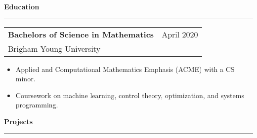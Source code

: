 \documentclass[12pt]{article}
\newenvironment{compactItemize}{
  \begin{itemize}[itemsep=0ex, parsep=0ex, partopsep=0ex, topsep= -7pt]
}{
  \end{itemize}
}
\newcommand{\jobInfo}[4]{
  \begingroup
  \setlength{\tabcolsep}{0ex}
  \begin{tabularx}{\linewidth}{X r}
    #1 & %
    #2\\ %
    #3 & %
    #4   %
  \end{tabularx}%
  \endgroup%
}
\newcommand{\degree}[4]{
  \jobInfo{\textbf{#1}}{#2}{#3}{#4}
}
\begin{document}
\textbf{Education}
\smallskip
\hrule

\degree{Bachelors of Science in Mathematics}{April 2020}{Brigham Young University}{}%
%
\begin{compactItemize}
  \item Applied and Computational Mathematics Emphasis (ACME) with a CS minor.
  \item Coursework on machine learning, control theory, optimization, and systems programming.
\end{compactItemize}
\begin{comment}
\smallskip
\textbf{Course Work and Topics}
  \begin{center}
    Analysis
    $\bullet$ Algorithm Design
    $\bullet$ Optimization
    $\bullet$ Control Theory
    \newline Machine Learning
    $\bullet$ Data Structures
    $\bullet$ Systems Programming
    $\bullet$ Applications Programming
  \end{center}
\end{comment}

\begin{comment}
\textbf{Skills}
\smallskip
\hrule
\begin{description}
  \item[Programming Lanugages:]   Python $\bullet$ C $\bullet$ C++ $\bullet$ C\# $\bullet$ Java $\bullet$ JavaScript
  \item [Other Tools:]     \LaTeX $\bullet$ Spreadsheets $\bullet$ SQL $\bullet$ Git $\bullet$ HTML
  \item [Soft Skills:] Tutoring $\bullet$ Public Speaking
\end{description}
\end{comment}

\textbf{Projects %
}
\smallskip
\hrule
\end{document}
